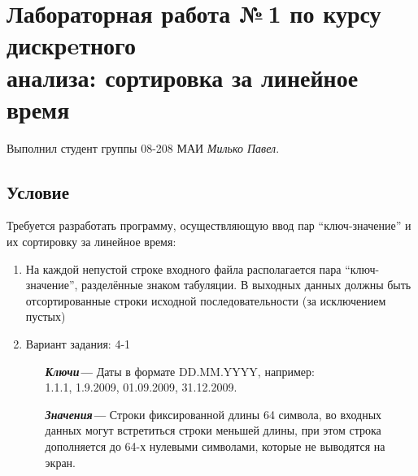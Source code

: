 \documentclass[12pt]{article}
\begin{document}
\section*{Лабораторная работа №\,1 по курсу дискрeтного\\ анализа: сортировка за линейное время}

Выполнил студент группы 08-208 МАИ \textit{Милько Павел}.
\subsection*{Условие}

Требуется разработать программу, осуществляющую ввод пар ``ключ-значение'' и их сортировку за линейное время: 
\begin{enumerate}
\item На каждой непустой строке входного файла располагается пара ``ключ-значение'', разделённые знаком табуляции. В выходных данных должны быть отсортированные строки исходной последовательности (за исключением пустых)
\item Вариант задания: 4-1
\begin{itemize}

 \item[\textbf{ \it Ключи---}] Даты в формате DD.MM.YYYY, например:\\ 1.1.1, 1.9.2009, 01.09.2009, 31.12.2009.
 \item[\textbf{ \it Значения---}] Строки фиксированной длины 64 символа, во входных данных могут встретиться строки меньшей длины, при этом строка дополняется до 64-х нулевыми символами, которые не выводятся на экран.

\end{itemize}
\end{enumerate}
\end{document}
